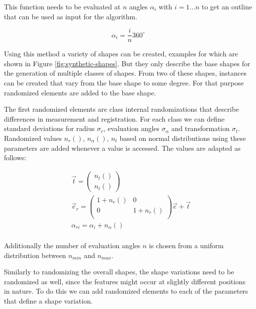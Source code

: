 \documentclass[pdftex,12pt,a4paper]{report}
\begin{document}
This function needs to be evaluated at $n$ angles $\alpha_i$ with $i = 1 ... n$ to get an outline that can be used as input for the algorithm.

\begin{equation}
	\alpha_i = \frac{i}{n} 360^{\circ}
\end{equation}

Using this method a variety of shapes can be created, examples for which are shown in Figure \ref{fig:synthetic-shapes}. But they only describe the base shapes for the generation of multiple classes of shapes. From two of these shapes, instances can be created that vary from the base shape to some degree. For that purpose randomized elements are added to the base shape.

The first randomized elements are class internal randomizations that describe differences in measurement and registration. For each class we can define standard deviations for radius $\sigma_r$, evaluation angles $\sigma_\alpha$ and transformation $\sigma_t$. Randomized values $n_r()$, $n_\alpha()$, $n_t$ based on normal distributions using these parameters are added whenever a value is accessed. The values are adapted as follows:

\begin{equation}
	\begin{split}
		& \vec{t} = \left( \begin{array}{c}
			n_t() \\
			n_t()
		\end{array} \right) \\
		& \vec{e}_r = \begin{pmatrix}
			1 + n_r() & 0 \\
			0 & 1 + n_r() \\
		\end{pmatrix} \vec{e}  + \vec{t} \\
		& \alpha_{ri} = \alpha_i + n_\alpha() \\
	\end{split}
\end{equation}

Additionally the number of evaluation angles $n$ is chosen from a uniform distribution between $n_{min}$ and $n_{max}$.

Similarly to randomizing the overall shapes, the shape variations need to be randomized as well, since the features might occur at slightly different positions in nature. To do this we can add randomized elements to each of the parameters that define a shape variation.
\end{document}
